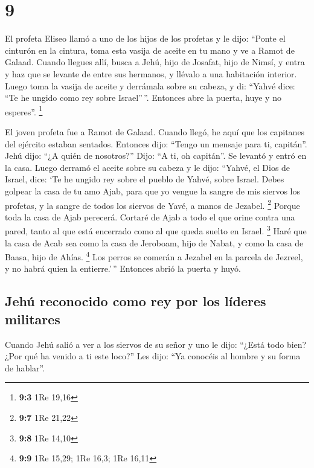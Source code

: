 \hypertarget{section-8}{%
\section{9}\label{section-8}}

 El profeta Eliseo llamó a uno de los hijos de los
profetas y le dijo: ``Ponte el cinturón en la cintura, toma esta vasija
de aceite en tu mano y ve a Ramot de Galaad.  Cuando
llegues allí, busca a Jehú, hijo de Josafat, hijo de Nimsí, y entra y
haz que se levante de entre sus hermanos, y llévalo a una habitación
interior.  Luego toma la vasija de aceite y derrámala
sobre su cabeza, y di: ``Yahvé dice: ``Te he ungido como rey sobre
Israel''\,''. Entonces abre la puerta, huye y no esperes''. \footnote{\textbf{9:3}
  1Re 19,16}

 El joven profeta fue a Ramot de Galaad. 
Cuando llegó, he aquí que los capitanes del ejército estaban sentados.
Entonces dijo: ``Tengo un mensaje para ti, capitán''. Jehú dijo: ``¿A
quién de nosotros?'' Dijo: ``A ti, oh capitán''.  Se
levantó y entró en la casa. Luego derramó el aceite sobre su cabeza y le
dijo: ``Yahvé, el Dios de Israel, dice: `Te he ungido rey sobre el
pueblo de Yahvé, sobre Israel.  Debes golpear la casa de
tu amo Ajab, para que yo vengue la sangre de mis siervos los profetas, y
la sangre de todos los siervos de Yavé, a manos de Jezabel. \footnote{\textbf{9:7}
  1Re 21,22}  Porque toda la casa de Ajab perecerá.
Cortaré de Ajab a todo el que orine contra una pared, tanto al que está
encerrado como al que queda suelto en Israel. \footnote{\textbf{9:8} 1Re
  14,10}  Haré que la casa de Acab sea como la casa de
Jeroboam, hijo de Nabat, y como la casa de Baasa, hijo de Ahías.
\footnote{\textbf{9:9} 1Re 15,29; 1Re 16,3; 1Re 16,11} 
Los perros se comerán a Jezabel en la parcela de Jezreel, y no habrá
quien la entierre.'\,'' Entonces abrió la puerta y huyó.

\hypertarget{jehuxfa-reconocido-como-rey-por-los-luxedderes-militares}{%
\subsection{Jehú reconocido como rey por los líderes
militares}\label{jehuxfa-reconocido-como-rey-por-los-luxedderes-militares}}

 Cuando Jehú salió a ver a los siervos de su señor y uno
le dijo: ``¿Está todo bien? ¿Por qué ha venido a ti este loco?'' Les
dijo: ``Ya conocéis al hombre y su forma de hablar''.

